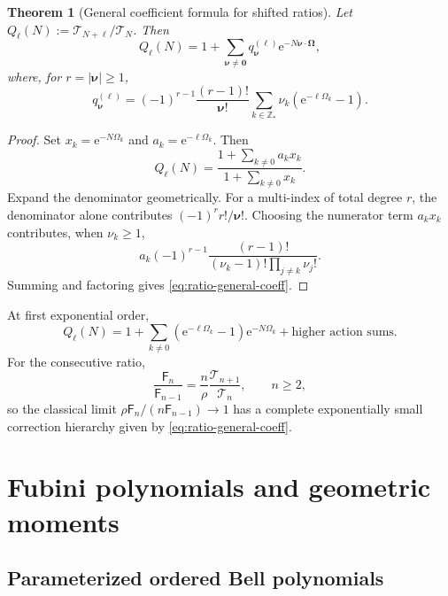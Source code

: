 \documentclass[11pt,oneside]{article}
\numberwithin{equation}{section}
\newtheorem{theorem}{Theorem}[section]
\newcommand{\e}{\mathrm e}
\newcommand{\Z}{\mathbb Z}
\newcommand{\Fub}{\mathsf F}
\newcommand{\abs}[1]{\left|#1\right|}
\newcommand{\paren}[1]{\left(#1\right)}
\begin{document}
\begin{theorem}[General coefficient formula for shifted ratios]
\label{thm:ratio-coefficients}
Let
\(Q_\ell(N):=\mathscr T_{N+\ell}/\mathscr T_N\).  Then
\begin{equation}
 Q_\ell(N)=1+
 \sum_{\bm\nu\ne\bm0}q_{\bm\nu}^{(\ell)}
 \e^{-N\bm\nu\cdot\bm\Omega},
 \label{eq:ratio-transseries}
\end{equation}
where, for \(r=\abs{\bm\nu}\ge1\),
\begin{equation}
 \boxed{\displaystyle
 q_{\bm\nu}^{(\ell)}
 =(-1)^{r-1}\frac{(r-1)!}{\bm\nu!}
 \sum_{k\in\Z_*}\nu_k\paren{\e^{-\ell\Omega_k}-1}.}
 \label{eq:ratio-general-coeff}
\end{equation}
\end{theorem}

\begin{proof}
Set \(x_k=\e^{-N\Omega_k}\) and \(a_k=\e^{-\ell\Omega_k}\).  Then
\[
 Q_\ell(N)=\frac{1+\sum_{k\ne0}a_kx_k}
                 {1+\sum_{k\ne0}x_k}.
\]
Expand the denominator geometrically.  For a multi-index of total degree \(r\), the denominator alone contributes
\((-1)^r r!/\bm\nu!\).  Choosing the numerator term \(a_kx_k\) contributes, when \(\nu_k\ge1\),
\[
 a_k(-1)^{r-1}\frac{(r-1)!}
 {\paren{\nu_k-1}!\prod_{j\ne k}\nu_j!}.
\]
Summing and factoring gives \cref{eq:ratio-general-coeff}.
\end{proof}

At first exponential order,
\begin{equation}
 Q_\ell(N)
 =1+\sum_{k\ne0}\paren{\e^{-\ell\Omega_k}-1}
 \e^{-N\Omega_k}+\text{higher action sums}.
 \label{eq:ratio-first-order}
\end{equation}
For the consecutive ratio,
\begin{equation}
 \frac{\Fub_n}{\Fub_{n-1}}
 =\frac{n}{\rho}\frac{\mathscr T_{n+1}}{\mathscr T_n},
 \qquad n\ge2,
 \label{eq:consecutive-ratio}
\end{equation}
so the classical limit \(\rho\Fub_n/(n\Fub_{n-1})\to1\) has a complete exponentially small correction hierarchy given by \cref{eq:ratio-general-coeff}.

\section{Fubini polynomials and geometric moments}
\label{sec:polynomials}

\subsection{Parameterized ordered Bell polynomials}
\end{document}
